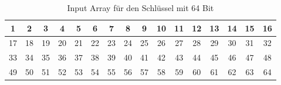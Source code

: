 \begin{table}[h]
    \centering
        \begin{tabular}{|*{16}{c|}}
        \hline
        \cellcolor{red-1}1 & \cellcolor{red-1}2 & \cellcolor{red-1}3 & \cellcolor{red-1}4 & 
        \cellcolor{red-1}5 & \cellcolor{red-1}6 & \cellcolor{red-1}7 & \cellcolor{red-1}8 & 
        \cellcolor{yellow-1}9 & \cellcolor{yellow-1}10 & \cellcolor{yellow-1}11 & \cellcolor{yellow-1}12 & 
        \cellcolor{yellow-1}13 & \cellcolor{yellow-1}14 & \cellcolor{yellow-1}15 & \cellcolor{yellow-1}16 \\
        \hline
        \cellcolor{green-1}17 & \cellcolor{green-1}18 & \cellcolor{green-1}19 & \cellcolor{green-1}20 & 
        \cellcolor{green-1}21 & \cellcolor{green-1}22 & \cellcolor{green-1}23 & \cellcolor{green-1}24 & 
        \cellcolor{blue-1}25 & \cellcolor{blue-1}26 & \cellcolor{blue-1}27 & \cellcolor{blue-1}28 & 
        \cellcolor{blue-1}29 & \cellcolor{blue-1}30 & \cellcolor{blue-1}31 & \cellcolor{blue-1}32 \\
        \hline
        \cellcolor{orange-1}33 & \cellcolor{orange-1}34 & \cellcolor{orange-1}35 & \cellcolor{orange-1}36 & 
        \cellcolor{orange-1}37 & \cellcolor{orange-1}38 & \cellcolor{orange-1}39 & \cellcolor{orange-1}40 & 
        \cellcolor{purple-1}41 & \cellcolor{purple-1}42 & \cellcolor{purple-1}43 & \cellcolor{purple-1}44 & 
        \cellcolor{purple-1}45 & \cellcolor{purple-1}46 & \cellcolor{purple-1}47 & \cellcolor{purple-1}48 \\
        \hline
        \cellcolor{cyan-1}49 & \cellcolor{cyan-1}50 & \cellcolor{cyan-1}51 & \cellcolor{cyan-1}52 & 
        \cellcolor{cyan-1}53 & \cellcolor{cyan-1}54 & \cellcolor{cyan-1}55 & \cellcolor{cyan-1}56 & 
        \cellcolor{magenta-1}57 & \cellcolor{magenta-1}58 & \cellcolor{magenta-1}59 & \cellcolor{magenta-1}60 & 
        \cellcolor{magenta-1}61 & \cellcolor{magenta-1}62 & \cellcolor{magenta-1}63 & \cellcolor{magenta-1}64 \\
        \hline
        \end{tabular}
    \caption{Input Array für den Schlüssel mit 64 Bit}
\end{table}

